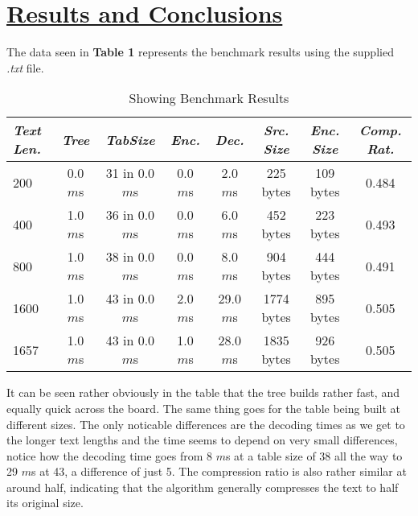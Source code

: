 \documentclass[a4paper,11pt]{article}
\begin{document}
\section*{
	\underline{Results and Conclusions}
	}
The data seen in \textbf{Table 1} represents the benchmark results using the supplied \textit{.txt} file.


\begin{table}[h]
\begin{center}
\caption{Showing Benchmark Results}
\label{tab:Table 1}
\begin{tabular}{|l|c|c|c|c|c|c|c|}
	\hline
\textit{Text Len.} & \textit{Tree} & \textit{TabSize} & \textit{Enc.} & \textit{Dec.} & \textit{Src. Size} & \textit{Enc. Size} & \textit{Comp. Rat.}\\
\hline
200 & 0.0 $m$s & 31 in 0.0 $m$s & 0.0 $m$s & 2.0 $m$s & 225 bytes & 109 bytes & 0.484 \\
\hline 
400 & 1.0 $m$s & 36 in 0.0 $m$s & 0.0 $m$s & 6.0 $m$s & 452 bytes & 223 bytes & 0.493 \\
\hline 
800 & 1.0 $m$s & 38 in 0.0 $m$s & 0.0 $m$s & 8.0 $m$s & 904 bytes & 444 bytes & 0.491 \\
\hline 
1600 & 1.0 $m$s & 43 in 0.0 $m$s & 2.0 $m$s & 29.0 $m$s & 1774 bytes & 895 bytes & 0.505 \\
\hline 
1657 & 1.0 $m$s & 43 in 0.0 $m$s & 1.0 $m$s & 28.0 $m$s & 1835 bytes & 926 bytes & 0.505 \\
\hline 

\end{tabular}
\end{center}
\end{table}

It can be seen rather obviously in the table that the tree builds rather fast, and equally quick across the board. The same thing goes for the table being built at different sizes. The only noticable differences are the decoding times as we get to the longer text lengths and the time seems to depend on very small differences, notice how the decoding time goes from 8 $m$s at a table size of 38 all the way to 29 $m$s at 43, a difference of just 5. The compression ratio is also rather similar at around half, indicating that the algorithm generally compresses the text to half its original size.
\end{document}
